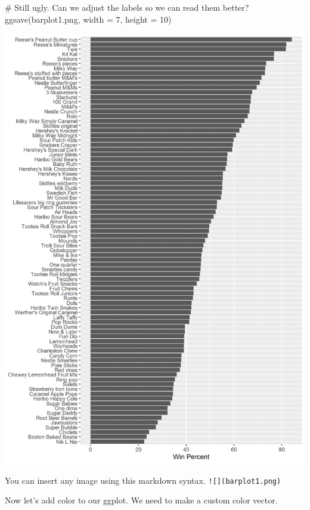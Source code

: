 \documentclass[
  letterpaper,
  DIV=11,
  numbers=noendperiod]{scrartcl}
\newenvironment{Shaded}{\begin{snugshade}}{\end{snugshade}}
\newcommand{\AttributeTok}[1]{\textcolor[rgb]{0.40,0.45,0.13}{#1}}
\newcommand{\CommentTok}[1]{\textcolor[rgb]{0.37,0.37,0.37}{#1}}
\newcommand{\DecValTok}[1]{\textcolor[rgb]{0.68,0.00,0.00}{#1}}
\newcommand{\FunctionTok}[1]{\textcolor[rgb]{0.28,0.35,0.67}{#1}}
\newcommand{\NormalTok}[1]{\textcolor[rgb]{0.00,0.23,0.31}{#1}}
\newcommand{\StringTok}[1]{\textcolor[rgb]{0.13,0.47,0.30}{#1}}
\begin{document}
\begin{Shaded}
\begin{Highlighting}[]
\CommentTok{\# Still ugly. Can we adjust the labels so we can read them better?}
\FunctionTok{ggsave}\NormalTok{(}\StringTok{\textquotesingle{}barplot1.png\textquotesingle{}}\NormalTok{, }\AttributeTok{width =} \DecValTok{7}\NormalTok{, }\AttributeTok{height =} \DecValTok{10}\NormalTok{)}
\end{Highlighting}
\end{Shaded}

\includegraphics{barplot1.png}

You can insert any image using this markdown syntax.
\texttt{!{[}{]}(barplot1.png)}

Now let's add color to our ggplot. We need to make a custom color
vector.
\end{document}
